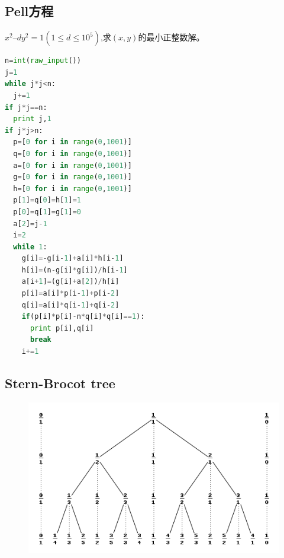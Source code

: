 \documentclass[UTF8,a4paper,titlepage]{ctexart}
\begin{document}
\subsection{Pell方程}
$x^2–dy^2=1(1\leq d\leq10^5)$,求$(x,y)$的最小正整数解。
\begin{lstlisting}[language=python]
n=int(raw_input())
j=1
while j*j<n:
  j+=1
if j*j==n:
  print j,1
if j*j>n:
  p=[0 for i in range(0,1001)]
  q=[0 for i in range(0,1001)]
  a=[0 for i in range(0,1001)]
  g=[0 for i in range(0,1001)]
  h=[0 for i in range(0,1001)]
  p[1]=q[0]=h[1]=1
  p[0]=q[1]=g[1]=0
  a[2]=j-1
  i=2
  while 1:
    g[i]=-g[i-1]+a[i]*h[i-1]
    h[i]=(n-g[i]*g[i])/h[i-1]
    a[i+1]=(g[i]+a[2])/h[i]
    p[i]=a[i]*p[i-1]+p[i-2]
    q[i]=a[i]*q[i-1]+q[i-2]
    if(p[i]*p[i]-n*q[i]*q[i]==1):
      print p[i],q[i]
      break
    i+=1
\end{lstlisting}
\subsection{Stern-Brocot tree}
\begin{figure}[h!]
	\centering
	\includegraphics[scale=0.8]{images/sbtree.png}
	\label{fig:SBtree}
\end{figure}
\end{document}
